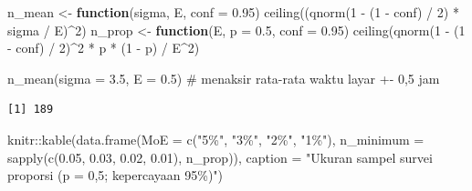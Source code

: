 \documentclass[
  indonesian,
  letterpaper,
]{book}
\newenvironment{Shaded}{\begin{snugshade}}{\end{snugshade}}
\newcommand{\AttributeTok}[1]{\textcolor[rgb]{0.40,0.45,0.13}{#1}}
\newcommand{\CommentTok}[1]{\textcolor[rgb]{0.37,0.37,0.37}{#1}}
\newcommand{\ControlFlowTok}[1]{\textcolor[rgb]{0.00,0.23,0.31}{\textbf{#1}}}
\newcommand{\DecValTok}[1]{\textcolor[rgb]{0.68,0.00,0.00}{#1}}
\newcommand{\FloatTok}[1]{\textcolor[rgb]{0.68,0.00,0.00}{#1}}
\newcommand{\FunctionTok}[1]{\textcolor[rgb]{0.28,0.35,0.67}{#1}}
\newcommand{\NormalTok}[1]{\textcolor[rgb]{0.00,0.23,0.31}{#1}}
\newcommand{\OtherTok}[1]{\textcolor[rgb]{0.00,0.23,0.31}{#1}}
\newcommand{\SpecialCharTok}[1]{\textcolor[rgb]{0.37,0.37,0.37}{#1}}
\newcommand{\StringTok}[1]{\textcolor[rgb]{0.13,0.47,0.30}{#1}}
\begin{document}
\begin{Shaded}
\begin{Highlighting}[]
\NormalTok{n\_mean }\OtherTok{\textless{}{-}} \ControlFlowTok{function}\NormalTok{(sigma, E, }\AttributeTok{conf =} \FloatTok{0.95}\NormalTok{) }\FunctionTok{ceiling}\NormalTok{((}\FunctionTok{qnorm}\NormalTok{(}\DecValTok{1} \SpecialCharTok{{-}}\NormalTok{ (}\DecValTok{1} \SpecialCharTok{{-}}\NormalTok{ conf) }\SpecialCharTok{/} \DecValTok{2}\NormalTok{) }\SpecialCharTok{*}\NormalTok{ sigma }\SpecialCharTok{/}\NormalTok{ E)}\SpecialCharTok{\^{}}\DecValTok{2}\NormalTok{)}
\NormalTok{n\_prop }\OtherTok{\textless{}{-}} \ControlFlowTok{function}\NormalTok{(E, }\AttributeTok{p =} \FloatTok{0.5}\NormalTok{, }\AttributeTok{conf =} \FloatTok{0.95}\NormalTok{) }\FunctionTok{ceiling}\NormalTok{(}\FunctionTok{qnorm}\NormalTok{(}\DecValTok{1} \SpecialCharTok{{-}}\NormalTok{ (}\DecValTok{1} \SpecialCharTok{{-}}\NormalTok{ conf) }\SpecialCharTok{/} \DecValTok{2}\NormalTok{)}\SpecialCharTok{\^{}}\DecValTok{2} \SpecialCharTok{*}\NormalTok{ p }\SpecialCharTok{*}\NormalTok{ (}\DecValTok{1} \SpecialCharTok{{-}}\NormalTok{ p) }\SpecialCharTok{/}\NormalTok{ E}\SpecialCharTok{\^{}}\DecValTok{2}\NormalTok{)}

\FunctionTok{n\_mean}\NormalTok{(}\AttributeTok{sigma =} \FloatTok{3.5}\NormalTok{, }\AttributeTok{E =} \FloatTok{0.5}\NormalTok{)   }\CommentTok{\# menaksir rata{-}rata waktu layar +{-} 0,5 jam}
\end{Highlighting}
\end{Shaded}

\begin{verbatim}
[1] 189
\end{verbatim}

\begin{Shaded}
\begin{Highlighting}[]
\NormalTok{knitr}\SpecialCharTok{::}\FunctionTok{kable}\NormalTok{(}\FunctionTok{data.frame}\NormalTok{(}\AttributeTok{MoE =} \FunctionTok{c}\NormalTok{(}\StringTok{"5\%"}\NormalTok{, }\StringTok{"3\%"}\NormalTok{, }\StringTok{"2\%"}\NormalTok{, }\StringTok{"1\%"}\NormalTok{),}
                        \AttributeTok{n\_minimum =} \FunctionTok{sapply}\NormalTok{(}\FunctionTok{c}\NormalTok{(}\FloatTok{0.05}\NormalTok{, }\FloatTok{0.03}\NormalTok{, }\FloatTok{0.02}\NormalTok{, }\FloatTok{0.01}\NormalTok{), n\_prop)),}
             \AttributeTok{caption =} \StringTok{"Ukuran sampel survei proporsi (p = 0,5; kepercayaan 95\%)"}\NormalTok{)}
\end{Highlighting}
\end{Shaded}
\end{document}
